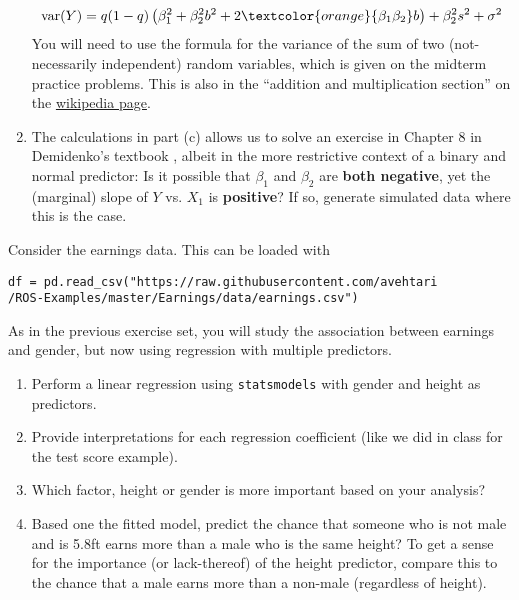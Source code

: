 \begin{exercise}
\begin{enumerate}[label=(\alph*)]
\begin{equation*}
{\rm var}(Y) = q(1-q)\left(\beta_1^2 + \beta_2^2b^2 + 2 \textcolor{orange}{\beta_1\beta_2} b \right) + \beta_2^2s^2
+ \sigma^2
\end{equation*}
You will need to use the formula for the variance of the sum of two (not-necessarily independent) random variables, which is given on the midterm practice problems.  
This is also in the ``addition and multiplication section'' on the \href{https://en.wikipedia.org/wiki/Variance#Properties}{wikipedia  page}.
\item The calculations in part (c) allows us to solve an exercise in Chapter 8 in Demidenko's textbook \cite{demidenko2019advanced}, albeit in the more restrictive  context of a binary and normal predictor: 
Is it possible that $\beta_1$ and $\beta_2$ are {\bf both negative}, yet the (marginal) slope of $Y$ vs. $X_1$ is {\bf positive}? If so, generate simulated data where this is the case. 
\end{enumerate}
\end{exercise}





\begin{exercise} Consider the earnings data. This can be loaded with 
\begin{Verbatim}
df = pd.read_csv("https://raw.githubusercontent.com/avehtari
/ROS-Examples/master/Earnings/data/earnings.csv")
\end{Verbatim}
As in the previous exercise set, you will study the association between earnings and gender, but now using regression with multiple predictors. 

\begin{enumerate}[label=(\alph*)]
\item Perform a linear regression using \verb!statsmodels! with gender and height as predictors. 
\item Provide interpretations for each regression coefficient (like we did in class for the test score example). 
\item Which factor, height or gender is more important based on your analysis? 
\item Based one the fitted model, predict the chance that someone who is not male and is 5.8ft earns more than a male who is the same height? To get a sense for the importance (or lack-thereof) of the height predictor, compare this to the chance that a male earns more than a non-male (regardless of height).
\end{enumerate}
\end{exercise}

